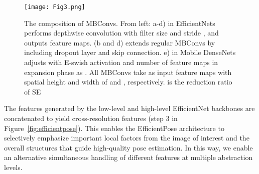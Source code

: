 \begin{table*}[htbp]
\begin{tabular}{|c|c|c|c|c|c|c|c|}
 &                                   &                                            &   &                                            &                                            &                                           &                                            \\ \hline
\end{tabular}
\end{table*}

\begin{figure*}
\begin{center}
\texttt{[image: Fig3.png]}
\caption{The composition of MBConvs. From left: a-d)  in EfficientNets performs depthwise convolution with filter size  and stride , and outputs  feature maps.  (b and d) extends regular MBConvs by including dropout layer and skip connection. e)  in Mobile DenseNets adjusts  with E-swish activation and number of feature maps in expansion phase as . All MBConvs take as input  feature maps with spatial height and width of  and , respectively.  is the reduction ratio of SE}
\label{fig:mbconvs}
\end{center}
\end{figure*}

The features generated by the low-level and high-level EfficientNet backbones are concatenated to yield cross-resolution features (step 3 in Figure~\ref{fig:efficientpose}). This enables the EfficientPose architecture to selectively emphasize important local factors from the image of interest and the overall structures that guide high-quality pose estimation. In this way, we enable an alternative simultaneous handling of different features at multiple abstraction levels. 

